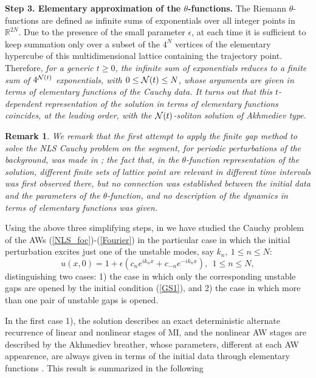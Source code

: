 \documentclass[12pt]{article}
\newcommand{\RR}{\mathbb R}
\newtheorem{remark}{Remark}
\newcommand{\beq}{\begin{equation}}
\newcommand{\eeq}{\end{equation}}
\newcommand{\eps}{{\epsilon}}
\begin{document}
\textbf{Step 3. Elementary approximation of the $\theta$-functions.} The Riemann $\theta$-functions are defined as infinite sums of exponentials over all integer points in $\RR^{2N}$. Due to the presence of the small parameter $\epsilon$, at each time it is sufficient to keep summation only over a subset of the $4^{{N}}$ vertices of the elementary hypercube of this multidimensional lattice containing the trajectory point. Therefore, {\it for a generic $t\ge 0$, the infinite sum of exponentials reduces to a finite sum of $4^{{\cal N}(t)}$  exponentials, with $0\le {\cal N}(t)\le N$, whose arguments are given in terms of elementary functions of the Cauchy data. It turns out that this $t$-dependent representation of the solution in terms of elementary functions coincides, at the leading order, with the ${\cal N}(t)$-soliton solution of Akhmediev type}.
\begin{remark}
We remark that the first attempt to apply the finite gap method to solve the NLS Cauchy problem on the segment, for periodic perturbations of the background, was made in \cite{Tracy}; the fact that, in the $\theta$-function representation of the solution, different finite sets of lattice point are relevant in different time intervals was first observed there, but no connection was established between the initial data and the parameters of the $\theta$-function, and no description of the dynamics in terms of elementary functions was given.
\end{remark}

Using the above three simplifying steps, in \cite{GS1} we have studied the Cauchy problem of the AWs (\ref{NLS_foc})-(\ref{Fourier}) in the particular case in which the initial perturbation excites just one of the unstable modes, say $k_n,~1\le n\le N$:
\beq\label{GS1}
u(x,0)=1+\eps(c_n e^{i k_n x}+c_{-n} e^{-i k_n x}), \ \ 1\le n\le N,
\eeq
distinguishing two cases: 1) the case in which only the corresponding unstable gaps are opened by the initial condition (\ref{GS1}), and 2) the case in which  more than one pair of unstable gaps is opened.

  In the first case 1), the solution describes an exact deterministic alternate recurrence of linear and nonlinear stages of MI, and the nonlinear AW stages are described by the Akhmediev breather, whose parameters, different at each AW appearence, are always given in terms of the initial data through elementary functions \cite{GS1}. This result is summarized in the following
\end{document}
